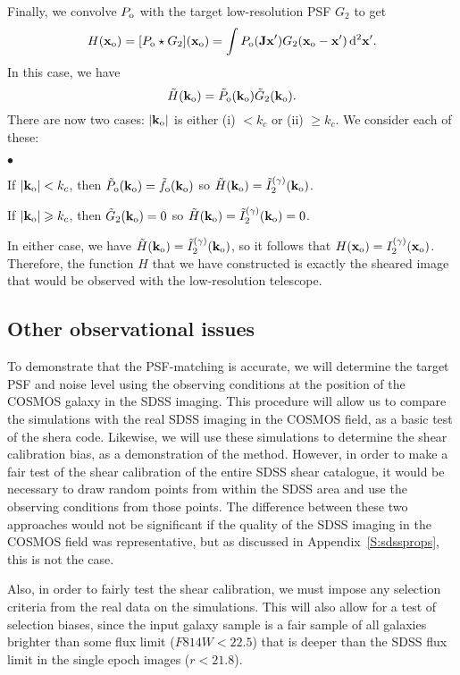 \documentclass[twocolumn,useAMS,usenatbib]{mn2e}
\newcommand{\beq}{\begin{equation}}
\newcommand{\eeq}{\end{equation}}
\newcommand{\rmd}{\mathrm{d}}
\begin{document}
Finally, we convolve $P_{\rm o}$ with the target low-resolution PSF $G_2$ to get
\beq
H({\bf x}_{\rm o}) = [P_{\rm o}\star G_2]({\bf x}_{\rm o}) = \int P_{\rm o}({\bf Jx}') G_2({\bf x}_{\rm o}-{\bf x}')\,\rmd^2{\bf x}'.
\eeq
In this case, we have
\beq
\tilde H({\bf k}_{\rm o}) = \tilde P_{\rm o}({\bf k}_{\rm o}) \tilde G_2({\bf k}_{\rm o}).
\eeq
There are now two cases: $|{\bf k}_{\rm o}|$ is either (i) $<k_c$ or (ii) $\ge k_c$.  We consider each of these:
\begin{list}{$\bullet$}{}
\item If $|{\bf k}_{\rm o}|<k_c$, then $\tilde P_{\rm o}({\bf k}_{\rm o})=\tilde f_{\rm o}({\bf k}_{\rm o})$ so $\tilde H({\bf k}_{\rm o}) = \tilde I^{(\gamma)}_2({\bf k}_{\rm 
o})$.
\item If $|{\bf k}_{\rm o}|\ge k_c$, then $\tilde G_2({\bf k}_{\rm o})=0$ so $\tilde H({\bf k}_{\rm o}) = \tilde I^{(\gamma)}_2({\bf k}_{\rm  
o})=0$.
\end{list}
In either case, we have $\tilde H({\bf k}_{\rm o}) = \tilde I^{(\gamma)}_2({\bf k}_{\rm  
o})$, so it follows that $H({\bf x}_{\rm o})=I^{(\gamma)}_2({\bf x}_{\rm o})$.  Therefore, the function $H$ that we have constructed is exactly
the sheared image that would be observed with the low-resolution telescope.

\subsection{Other observational issues}

To demonstrate that the PSF-matching is accurate, we will
determine the target PSF and noise level using the observing
conditions at the position of the COSMOS galaxy in the SDSS imaging.
This procedure will allow us to compare the simulations with the real
SDSS imaging in the COSMOS field, as a basic test of the {\sc shera}
code.  
Likewise, we will use these simulations to determine the shear
calibration bias, as a demonstration of the method.  However, in order
to make a fair test of the shear calibration of the entire SDSS shear catalogue, it
would be necessary to draw random points from within the SDSS area and
use the observing conditions from those points.  The difference
between these two approaches would not be significant if the quality
of the SDSS imaging in the COSMOS field was representative, but as discussed in Appendix~\ref{S:sdssprops}, this is not
the case.

Also, in order to fairly test the shear calibration, we must impose
any selection criteria from the real data on the simulations.  This
will also allow for a test of selection biases, since the input galaxy
sample is a fair sample of all galaxies brighter than some flux limit
($F814W<22.5$) that is deeper than the SDSS flux limit in the single epoch
images ($r<21.8$).
\end{document}
